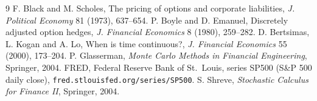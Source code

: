 \documentclass[10pt,a4paper]{article}
\begin{document}
\begin{thebibliography}{9}\footnotesize\setlength{\itemsep}{0pt}
 F. Black and M. Scholes, The pricing of options and corporate liabilities, \emph{J. Political Economy} 81 (1973), 637--654.
 P. Boyle and D. Emanuel, Discretely adjusted option hedges, \emph{J. Financial Economics} 8 (1980), 259--282.
 D. Bertsimas, L. Kogan and A. Lo, When is time continuous?, \emph{J. Financial Economics} 55 (2000), 173--204.
 P. Glasserman, \emph{Monte Carlo Methods in Financial Engineering}, Springer, 2004.
 FRED, Federal Reserve Bank of St.\ Louis, series SP500 (S\&P 500 daily close), \texttt{fred.stlouisfed.org/series/SP500}.
 S. Shreve, \emph{Stochastic Calculus for Finance II}, Springer, 2004.
\end{thebibliography}
\end{document}
